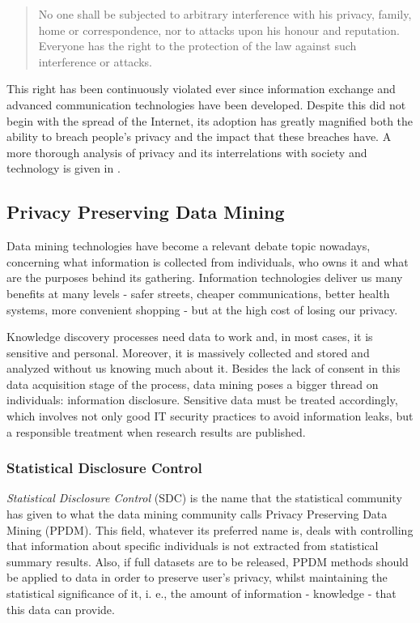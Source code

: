 \begin{quote}
	No one shall be subjected to arbitrary interference with his privacy, family, home or 
	correspondence, nor to attacks upon his honour and reputation. Everyone has the right to 
	the protection of the law against such interference or attacks.
\end{quote}

This right has been continuously violated ever since information exchange and advanced 
communication technologies have been developed. Despite this did not begin with the spread 
of the Internet, its adoption has greatly magnified both the ability to breach people’s privacy 
and the impact that these breaches have. A more thorough analysis of privacy and its interrelations
with society and technology is given in .

\subsection{Privacy Preserving Data Mining}
\label{Introduction::Context::PPSM}

Data mining technologies have become a relevant debate topic nowadays, concerning what 
information is collected from individuals, who owns it and what are the purposes behind 
its gathering. Information technologies deliver us many benefits at many levels - safer 
streets, cheaper communications, better health systems, more convenient shopping - but 
at the high cost of losing our privacy.

Knowledge discovery processes need data to work and, in most cases, it is sensitive and 
personal. Moreover, it is massively collected and stored and analyzed without us knowing 
much about it. Besides the lack of consent in this data acquisition stage of the process, 
data mining poses a bigger thread on individuals: information disclosure. Sensitive data 
must be treated accordingly, which involves not only good IT security practices to avoid 
information leaks, but a responsible treatment when research results are published.

\subsubsection{Statistical Disclosure Control}

\textit{Statistical Disclosure Control} (SDC) is the name that the statistical community 
has given to what the data mining community calls Privacy Preserving Data Mining (PPDM). 
This field, whatever its preferred name is, deals with controlling that information about 
specific individuals is not extracted from statistical summary results. Also, if full 
datasets are to be released, PPDM methods should be applied to data in order to preserve 
user's privacy, whilst maintaining the statistical significance of it, i. e., the amount 
of information - knowledge - that this data can provide.